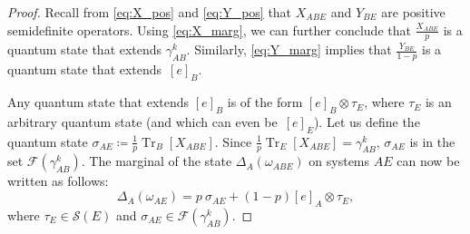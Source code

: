 \documentclass[10pt,a4paper]{amsart}
\begin{document}
\begin{proof}
    Recall from \eqref{eq:X_pos} and \eqref{eq:Y_pos} that $X_{ABE}$ and $Y_{BE}$ are positive semidefinite operators. Using \eqref{eq:X_marg}, we can further conclude that $\frac{X_{ABE}}{p}$ is a quantum state that extends $\gamma^k_{AB}$. Similarly, \eqref{eq:Y_marg} implies that $\frac{Y_{BE}}{1-p}$ is a quantum state that extends~$[e]_B$. 
    
    Any quantum state that extends $[e]_B$ is of the form $[e]_B\otimes\tau_E$, where $\tau_E$ is an arbitrary quantum state (and which can even be~$[e]_E$). Let us define the quantum state $\sigma_{AE} \coloneqq \frac{1}{p}\operatorname{Tr}_B\!\left[X_{ABE}\right]$. Since $\frac{1}{p}\operatorname{Tr}_E\!\left[X_{ABE}\right] = \gamma^k_{AB}$, $\sigma_{AE}$ is in the set $\mathcal{F}\!\left(\gamma^k_{AB}\right)$. The marginal of the state $\Delta_A\!\left(\omega_{ABE}\right)$ on systems $AE$ can now be written as follows:
    \begin{equation}
        \Delta_A\!\left(\omega_{AE}\right) = p~\sigma_{AE} + (1-p)[e]_A\otimes\tau_E,
    \end{equation}
    where $\tau_E \in \mathcal{S}\!\left(E\right)$ and $\sigma_{AE} \in \mathcal{F}\!\left(\gamma^k_{AB}\right)$.
\end{proof}
\end{document}
